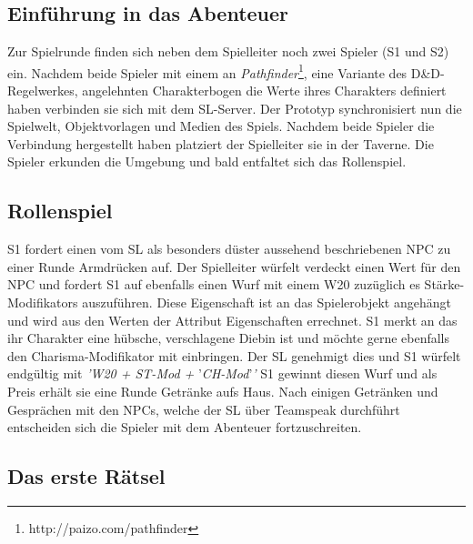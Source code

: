 \subsection{Einführung in das Abenteuer}
\label{sec:EinführungInDasAbenteuer}


Zur Spielrunde finden sich neben dem Spielleiter noch zwei Spieler (S1 und S2) ein. Nachdem beide Spieler mit einem an \emph{Pathfinder}\footnote{http://paizo.com/pathfinder}, eine Variante des D\&D-Regelwerkes, angelehnten Charakterbogen die Werte ihres Charakters definiert haben verbinden sie sich mit dem SL-Server. Der Prototyp synchronisiert nun die Spielwelt, Objektvorlagen und Medien des Spiels. Nachdem beide Spieler die Verbindung hergestellt haben platziert der Spielleiter sie in der Taverne.\newline
Die Spieler erkunden die Umgebung und bald entfaltet sich das Rollenspiel. 

\subsection{Rollenspiel}
\label{sec:Rollenspiel}

S1 fordert einen vom SL als besonders düster aussehend beschriebenen NPC zu einer Runde Armdrücken auf.\newline
Der Spielleiter würfelt verdeckt einen Wert für den NPC und fordert S1 auf ebenfalls einen Wurf mit einem W20 zuzüglich es Stärke-Modifikators auszuführen. Diese Eigenschaft ist an das Spielerobjekt angehängt und wird aus den Werten der Attribut Eigenschaften errechnet. S1 merkt an das ihr Charakter eine hübsche, verschlagene Diebin ist und möchte gerne ebenfalls den Charisma-Modifikator mit einbringen. Der SL genehmigt dies und S1 würfelt endgültig mit \emph{'W20 + ST-Mod + }'\emph{CH-Mod}'\emph{'}\newline
S1 gewinnt diesen Wurf und als Preis erhält sie eine Runde Getränke aufs Haus.\newline
Nach einigen Getränken und Gesprächen mit den NPCs, welche der SL über Teamspeak durchführt entscheiden sich die Spieler mit dem Abenteuer fortzuschreiten. 

\subsection{Das erste Rätsel}
\label{sec:DasErsteRätsel}

